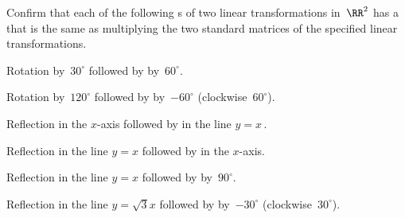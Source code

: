\begin{exercise}  
Confirm that each of the following s of two linear transformations in~\(\RR^2\) has a  that is the same as multiplying the two standard matrices of the specified linear transformations.

\begin{Parts}
\item Rotation by~\(30^\circ\) followed by  by~\(60^\circ\).

\item Rotation by~\(120^\circ\) followed by  by~\(-60^\circ\) (clockwise~\(60^\circ\)).

\item Reflection in the \(x\)-axis followed by  in the line \(y=x\)\,.

\item Reflection in the line \(y=x\) followed by  in the \(x\)-axis.

\item Reflection in the line \(y=x\) followed by  by~\(90^\circ\).

\item Reflection in the line \(y=\sqrt3x\) followed by  by~\(-30^\circ\) (clockwise~\(30^\circ\)).

\end{Parts}
\end{exercise}





